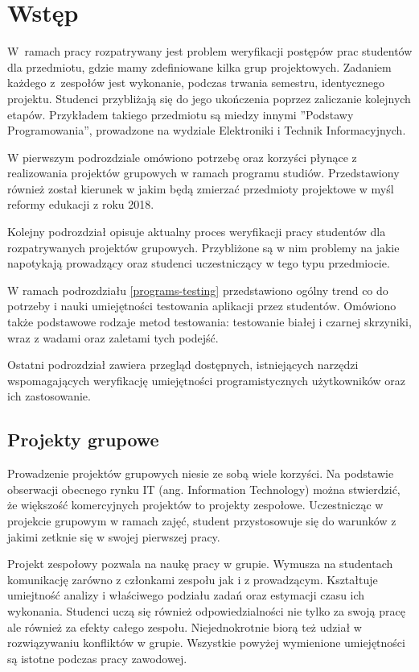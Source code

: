 \chapter{Wstęp}
\label{intro}

W~ramach pracy rozpatrywany jest problem weryfikacji postępów prac studentów dla przedmiotu, gdzie mamy zdefiniowane kilka grup projektowych.
Zadaniem każdego z~zespołów jest wykonanie, podczas trwania semestru, identycznego projektu.
Studenci przybliżają się do jego ukończenia poprzez zaliczanie kolejnych etapów.
Przykładem takiego przedmiotu są miedzy innymi ”Podstawy Programowania”, prowadzone na wydziale Elektroniki i Technik Informacyjnych.

W pierwszym podrozdziale omówiono potrzebę oraz korzyści płynące z realizowania projektów grupowych w ramach programu studiów. 
Przedstawiony również został kierunek w jakim będą zmierzać przedmioty projektowe w myśl reformy edukacji z roku 2018.

Kolejny podrozdział opisuje aktualny proces weryfikacji pracy studentów dla rozpatrywanych projektów grupowych.
Przybliżone są w nim problemy na jakie napotykają prowadzący oraz studenci uczestniczący w tego typu przedmiocie.

W ramach podrozdziału \ref{programs-testing} przedstawiono ogólny trend co do potrzeby i nauki umiejętności testowania aplikacji przez studentów.
Omówiono także podstawowe rodzaje metod testowania: testowanie białej i czarnej skrzyniki, wraz z wadami oraz zaletami tych podejść.

Ostatni podrozdział zawiera przegląd dostępnych, istniejących narzędzi wspomagających weryfikację umiejętności programistycznych użytkowników oraz ich zastosowanie.

\vfill

\section{Projekty grupowe}

Prowadzenie projektów grupowych niesie ze sobą wiele korzyści.
Na podstawie obserwacji obecnego rynku IT (ang. Information Technology) można stwierdzić, że większość komercyjnych projektów to projekty zespołowe.
Uczestnicząc w projekcie grupowym w ramach zajęć, student przystosowuje się do warunków z jakimi zetknie się w swojej pierwszej pracy.

Projekt zespołowy pozwala na naukę pracy w grupie.
Wymusza na studentach komunikację zarówno z członkami zespołu jak i z prowadzącym.
Kształtuje umiejtność analizy i właściwego podziału zadań oraz estymacji czasu ich wykonania.
Studenci uczą się również odpowiedzialności nie tylko za swoją pracę ale również za efekty całego zespołu.
Niejednokrotnie biorą też udział w rozwiązywaniu konfliktów w grupie.
Wszystkie powyżej wymienione umiejętności są istotne podczas pracy zawodowej.


